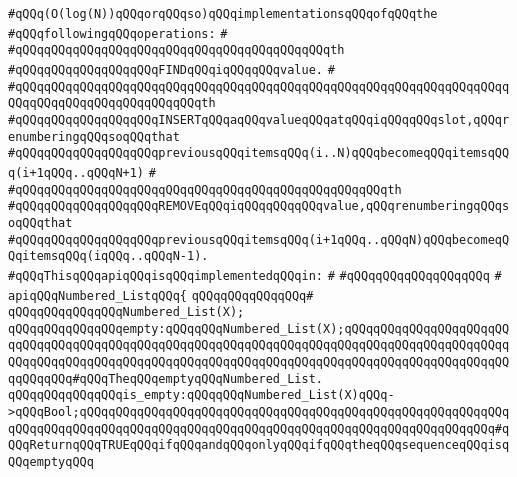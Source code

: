 \verb|#qQQq(O(log(N))qQQqorqQQqso)qQQqimplementationsqQQqofqQQqthe|\newline
\verb|#qQQqfollowingqQQqoperations:|\newline
\verb|#|\newline
\verb|#qQQqqQQqqQQqqQQqqQQqqQQqqQQqqQQqqQQqqQQqqQQqth|\newline
\verb|#qQQqqQQqqQQqqQQqqQQqFINDqQQqiqQQqqQQqvalue.|\newline
\verb|#|\newline
\verb|#qQQqqQQqqQQqqQQqqQQqqQQqqQQqqQQqqQQqqQQqqQQqqQQqqQQqqQQqqQQqqQQqqQQqqQQqqQQqqQQqqQQqqQQqqQQqqQQqth|\newline
\verb|#qQQqqQQqqQQqqQQqqQQqINSERTqQQqaqQQqvalueqQQqatqQQqiqQQqqQQqslot,qQQqrenumberingqQQqsoqQQqthat|\newline
\verb|#qQQqqQQqqQQqqQQqqQQqpreviousqQQqitemsqQQq(i..N)qQQqbecomeqQQqitemsqQQq(i+1qQQq..qQQqN+1)|\newline
\verb|#|\newline
\verb|#qQQqqQQqqQQqqQQqqQQqqQQqqQQqqQQqqQQqqQQqqQQqqQQqqQQqth|\newline
\verb|#qQQqqQQqqQQqqQQqqQQqREMOVEqQQqiqQQqqQQqqQQqvalue,qQQqrenumberingqQQqsoqQQqthat|\newline
\verb|#qQQqqQQqqQQqqQQqqQQqpreviousqQQqitemsqQQq(i+1qQQq..qQQqN)qQQqbecomeqQQqitemsqQQq(iqQQq..qQQqN-1).|\newline
\newline
\verb|#qQQqThisqQQqapiqQQqisqQQqimplementedqQQqin:|\newline
\verb|#|\newline
\verb|#qQQqqQQqqQQqqQQqqQQq|\newline
\verb|#|\newline
\verb|apiqQQqNumbered_ListqQQq{|\newline
\verb|qQQqqQQqqQQqqQQq#|\newline
\verb|qQQqqQQqqQQqqQQqNumbered_List(X);|\newline
\newline
\verb|qQQqqQQqqQQqqQQqempty:qQQqqQQqNumbered_List(X);qQQqqQQqqQQqqQQqqQQqqQQqqQQqqQQqqQQqqQQqqQQqqQQqqQQqqQQqqQQqqQQqqQQqqQQqqQQqqQQqqQQqqQQqqQQqqQQqqQQqqQQqqQQqqQQqqQQqqQQqqQQqqQQqqQQqqQQqqQQqqQQqqQQqqQQqqQQqqQQqqQQqqQQqqQQq#qQQqTheqQQqemptyqQQqNumbered_List.|\newline
\newline
\verb|qQQqqQQqqQQqqQQqis_empty:qQQqqQQqNumbered_List(X)qQQq->qQQqBool;qQQqqQQqqQQqqQQqqQQqqQQqqQQqqQQqqQQqqQQqqQQqqQQqqQQqqQQqqQQqqQQqqQQqqQQqqQQqqQQqqQQqqQQqqQQqqQQqqQQqqQQqqQQqqQQqqQQqqQQqqQQqqQQq#qQQqReturnqQQqTRUEqQQqifqQQqandqQQqonlyqQQqifqQQqtheqQQqsequenceqQQqisqQQqemptyqQQq|\newline
